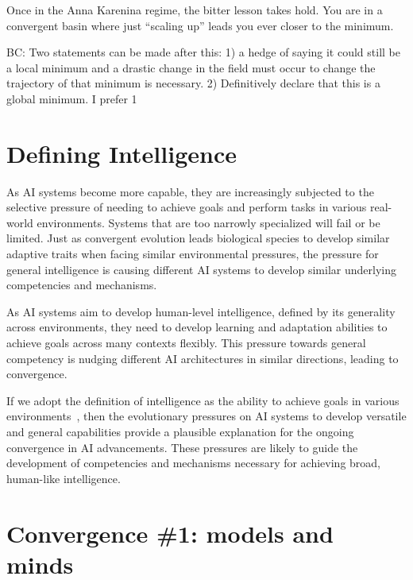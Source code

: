 \documentclass{article}
\newcommand{\bc}[1]{{\color{olive}BC: #1}}
\theoremstyle{plain}
\theoremstyle{definition}
\theoremstyle{remark}
\begin{document}
Once in the Anna Karenina regime, the bitter lesson takes hold. You are in a convergent basin where just ``scaling up'' leads you ever closer to the minimum.

\bc{Two statements can be made after this:
1) a hedge of saying it could still be a local minimum and a drastic change in the field must occur to change the trajectory of that minimum is necessary.
2) Definitively declare that this is a global minimum.
I prefer 1}

\section{Defining Intelligence}
As AI systems become more capable, they are increasingly subjected to the selective pressure of needing to achieve goals and perform tasks in various real-world environments. Systems that are too narrowly specialized will fail or be limited. Just as convergent evolution leads biological species to develop similar adaptive traits when facing similar environmental pressures, the pressure for general intelligence is causing different AI systems to develop similar underlying competencies and mechanisms.

 As AI systems aim to develop human-level intelligence, defined by its generality across environments, they need to develop learning and adaptation abilities to achieve goals across many contexts flexibly. This pressure towards general competency is nudging different AI architectures in similar directions, leading to convergence. 
 

 If we adopt the definition of intelligence as the ability to achieve goals in various environments~\cite{legg2008machine}, then the evolutionary pressures on AI systems to develop versatile and general capabilities provide a plausible explanation for the ongoing convergence in AI advancements. These pressures are likely to guide the development of competencies and mechanisms necessary for achieving broad, human-like intelligence.
 
\section{Convergence \#1: models and minds} \label{sec:models-and-minds}
\end{document}
